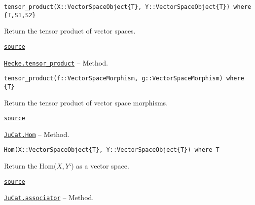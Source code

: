 \documentclass{memoir}
\begin{document}
\begin{adjustwidth}{2em}{0pt}


\begin{verbatim}
tensor_product(X::VectorSpaceObject{T}, Y::VectorSpaceObject{T}) where {T,S1,S2}
\end{verbatim}

Return the tensor product of vector spaces.



\href{https://github.com/FabianMaeurer/JuCat.jl/blob/367390e2d003deec2ababa73caeab405e934bb35/src/structures/VectorSpaces/VectorSpaces.jl#L247-L251}{\texttt{source}}


\end{adjustwidth}
\hypertarget{3913359957533821152}{} 
\hyperlink{3913359957533821152}{\texttt{Hecke.tensor\_product}}  -- {Method.}

\begin{adjustwidth}{2em}{0pt}


\begin{verbatim}
tensor_product(f::VectorSpaceMorphism, g::VectorSpaceMorphism) where {T}
\end{verbatim}

Return the tensor product of vector space morphisms.



\href{https://github.com/FabianMaeurer/JuCat.jl/blob/367390e2d003deec2ababa73caeab405e934bb35/src/structures/VectorSpaces/VectorSpaces.jl#L260-L264}{\texttt{source}}


\end{adjustwidth}
\hypertarget{17722560261235752128}{} 
\hyperlink{17722560261235752128}{\texttt{JuCat.Hom}}  -- {Method.}

\begin{adjustwidth}{2em}{0pt}


\begin{verbatim}
Hom(X::VectorSpaceObject{T}, Y::VectorSpaceObject{T}) where T
\end{verbatim}

Return the Hom(\(X,Y\)`) as a vector space.



\href{https://github.com/FabianMaeurer/JuCat.jl/blob/367390e2d003deec2ababa73caeab405e934bb35/src/structures/VectorSpaces/VectorSpaces.jl#L346-L350}{\texttt{source}}


\end{adjustwidth}
\hypertarget{10556131517828134115}{} 
\hyperlink{10556131517828134115}{\texttt{JuCat.associator}}  -- {Method.}
\end{document}

